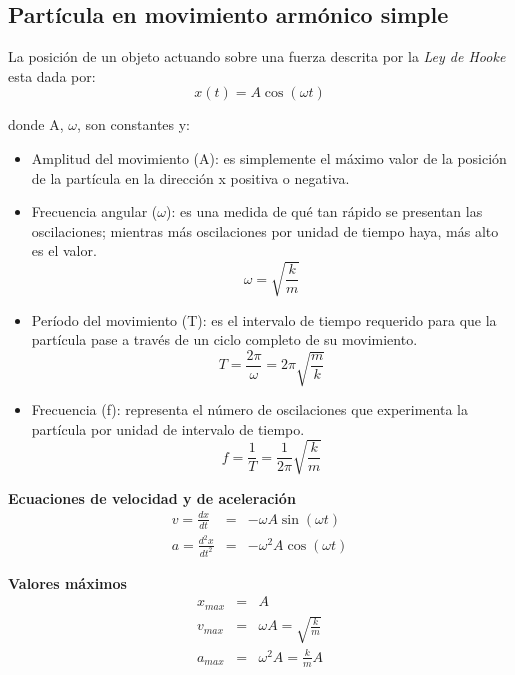 \subsection{Partícula en movimiento armónico simple}

  \PN La posición de un objeto actuando sobre una fuerza descrita por la \textit{Ley de Hooke} esta dada por:
  \begin{equation}
    x(t) = A \cos (\omega t)
  \end{equation}

  \PN donde A, $\omega$, son constantes y:
  \begin{itemize}
    \item Amplitud del movimiento (A): es simplemente el máximo valor de la posición de la partícula en la dirección x
    positiva o negativa.
    \item Frecuencia angular ($\omega$): es una medida de qué tan rápido se presentan las oscilaciones;
    mientras más oscilaciones por unidad de tiempo haya, más alto es el valor.
    \begin{equation}
      \omega = \sqrt{\frac{k}{m}}
    \end{equation}
    \item Período del movimiento (T): es el intervalo de tiempo requerido para que la partícula pase a través de un
    ciclo completo de su movimiento.
    \begin{equation}
      T = \frac{2\pi}{\omega} = 2\pi \sqrt{\frac{m}{k}}
    \end{equation}
    \item Frecuencia (f): representa el número de oscilaciones que experimenta la partícula por unidad de intervalo de
    tiempo.
    \begin{equation}
      f = \frac{1}{T} = \frac{1}{2\pi} \sqrt{\frac{k}{m}}
    \end{equation}
  \end{itemize}

  \PN \textbf{Ecuaciones de velocidad y de aceleración}
  \begin{eqnarray*}
    v = \frac{dx}{dt} &=& - \omega A \sin (\omega t) \\
    a = \frac{d^{2}x}{dt^{2}} &=& - \omega^{2} A \cos (\omega t)
  \end{eqnarray*}

  \PN \textbf{Valores máximos}
  \begin{eqnarray*}
    x_{max} &=& A \\
    v_{max} &=& \omega A = \sqrt{\frac{k}{m}} \\
    a_{max} &=& \omega^{2} A = \frac{k}{m} A
  \end{eqnarray*}
